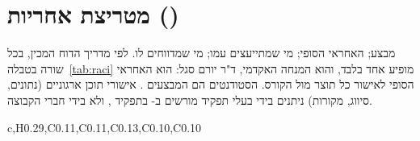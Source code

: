 \section{מטריצת אחריות ()}
 מבצע;  האחראי הסופי;  מי שמתייעצים עמו;  מי שמדווחים לו. לפי מדריך הדוח המכין, בכל שורה בטבלה~\ref{tab:raci}
מופיע  אחד בלבד, והוא המנחה האקדמי, ד"ר יורם סגל: הוא האחראי הסופי לאישור כל תוצר מול הקורס. הסטודנטים הם המבצעים
. אישורי תוכן ארגוניים (נתונים, סיווג, מקורות) ניתנים בידי בעלי תפקיד מורשים ב- בתפקיד , ולא בידי חברי הקבוצה.
\begin{table}[!htbp]
\centering
\caption{מטריצת  ברמת משימה (קודים זהים ל- ולגאנט): בכל שורה  אחד --- המנחה האקדמי}\label{tab:raci}
\begin{pctable}{c,H{0.29},C{0.11},C{0.11},C{0.13},C{0.10},C{0.10}}
\end{pctable}
\end{table}

